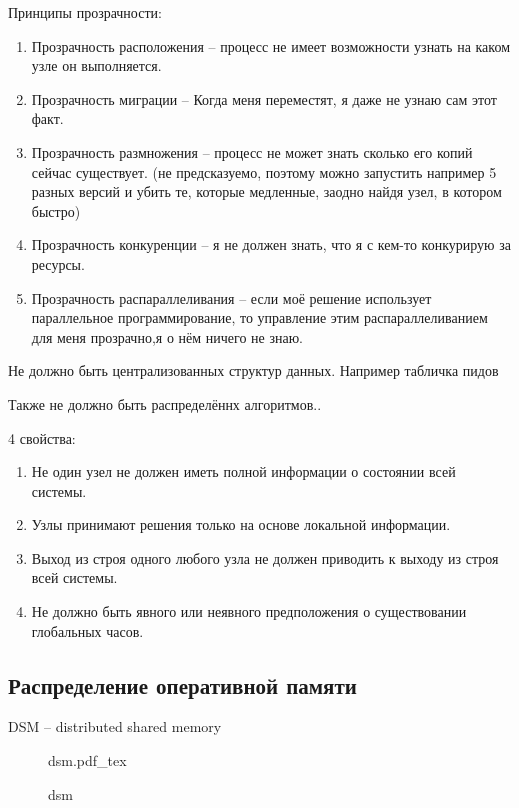 \documentclass{book}
\theoremstyle{definition}
\newcommand{\incfig}[1]{%
    \def\svgwidth{\columnwidth}
    {#1.pdf_tex}
}
\begin{document}
Принципы прозрачности:
\begin{enumerate}
    \item Прозрачность расположения -- процесс не имеет возможности узнать на каком узле он выполняется.
    \item Прозрачность миграции -- Когда меня переместят, я даже не узнаю сам этот факт.
    \item Прозрачность размножения -- процесс не может знать сколько его копий сейчас существует. (не предсказуемо, поэтому можно запустить например 5 разных версий и убить те, которые медленные, заодно найдя узел, в котором быстро)
    \item Прозрачность конкуренции -- я не должен знать, что я с кем-то конкурирую за ресурсы.
    \item Прозрачность распараллеливания -- если моё решение использует параллельное программирование, то управление этим распараллеливанием для меня прозрачно,я  о нём ничего не знаю.
\end{enumerate}

Не должно быть централизованных структур данных. Например табличка пидов

Также не должно быть распределённх алгоритмов..

4 свойства:
\begin{enumerate}
    \item Не один узел не должен иметь полной информации о состоянии всей системы.
    \item Узлы принимают решения только на основе локальной информации.
    \item Выход из строя одного любого узла не должен приводить к выходу из строя всей системы.
    \item Не должно быть явного или неявного предположения о существовании глобальных часов.
\end{enumerate}

\subsection{Распределение оперативной памяти}

DSM -- distributed shared memory

\begin{figure}[!ht]
    \centering
    \incfig{dsm}
    \caption{dsm}
    \label{fig:dsm}
\end{figure}
\end{document}
